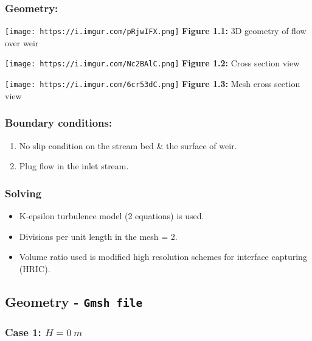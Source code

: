 \documentclass[11pt]{article}
\providecommand{\tightlist}{%
      \setlength{\itemsep}{0pt}\setlength{\parskip}{0pt}}
\begin{document}
\hypertarget{geometry}{%
\subsubsection{Geometry:}\label{geometry}}

\texttt{[image: https://i.imgur.com/pRjwIFX.png]} \textbf{Figure 1.1:}
3D geometry of flow over weir

\texttt{[image: https://i.imgur.com/Nc2BAlC.png]} \textbf{Figure 1.2:}
Cross section view

\texttt{[image: https://i.imgur.com/6cr53dC.png]} \textbf{Figure 1.3:}
Mesh cross section view

\hypertarget{boundary-conditions}{%
\subsubsection{Boundary conditions:}\label{boundary-conditions}}

\begin{enumerate}
\def\labelenumi{\arabic{enumi}.}
\tightlist
\item
  No slip condition on the stream bed \& the surface of weir.
\item
  Plug flow in the inlet stream.
\end{enumerate}

\hypertarget{solving}{%
\subsubsection{Solving}\label{solving}}

\begin{itemize}
\tightlist
\item
  K-epsilon turbulence model (2 equations) is used.
\item
  Divisions per unit length in the mesh = 2.
\item
  Volume ratio used is modified high resolution schemes for interface
  capturing (HRIC).
\end{itemize}

\hypertarget{geometry---gmsh-file}{%
\subsection{\texorpdfstring{Geometry -
\texttt{Gmsh\ file}}{Geometry - Gmsh file}}\label{geometry---gmsh-file}}

\hypertarget{case-1-h-0-m}{%
\subsubsection{\texorpdfstring{Case 1:
\(H = 0\ m\)}{Case 1: H = 0\textbackslash{} m}}\label{case-1-h-0-m}}
\end{document}
